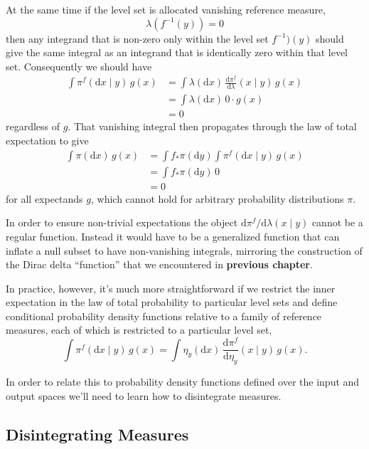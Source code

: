 \documentclass[11pt, oneside]{article}
\newcommand{\rnd}[2]{
  \ensuremath{ \frac{ \mathrm{d} #1}{ \mathrm{d} #2 } }
}
\begin{document}
At the same time if the level set is allocated vanishing reference measure,
%
\begin{equation*}
\lambda( f^{-1}(y) ) = 0
\end{equation*}
%
then any integrand that is non-zero only within the level set $f^{-1})(y)$ should 
give the same integral as an integrand that is identically zero within that level 
set.  Consequently we should have
%
\begin{align*}
\int \pi^{f}( \mathrm{d}x \mid y ) \, g(x)
&=
\int \lambda( \mathrm{d} x ) \, \rnd{ \pi^{f} }{ \lambda} (x \mid y) \, g(x)
\\
&=
\int \lambda( \mathrm{d} x ) \, 0 \cdot g(x)
\\
&=
0
\end{align*}
%
regardless of $g$.  That vanishing integral then propagates through the law of 
total expectation to give
%
\begin{align*}
\int \pi( \mathrm{d} x ) \, g(x)
&=
\int f_{*} \pi (\mathrm{d} y) \int \pi^{f}( \mathrm{d}x \mid y ) \, g(x)
\\
&=
\int f_{*} \pi (\mathrm{d} y) \, 0
\\
&=
0
\end{align*}
%
for all expectands $g$, which cannot hold for arbitrary probability distributions
$\pi$.

In order to ensure non-trivial expectations the object 
$\mathrm{d} \pi^{f} / \mathrm{d} \lambda(x \mid y)$ cannot be a regular function.
Instead it would have to be a generalized function that can inflate a null subset 
to have non-vanishing integrals, mirroring the construction of the Dirac delta
``function'' that we encountered in \textbf{previous chapter}.

In practice, however, it's much more straightforward if we restrict the inner 
expectation in the law of total probability to particular level sets and define 
conditional probability density functions relative to a family of reference measures, 
each of which is restricted to a particular level set,
%
\begin{equation*}
\int \pi^{f}( \mathrm{d}x \mid y ) \, g(x)
=
\int \eta_{y}( \mathrm{d} x ) \, \rnd{ \pi^{f} }{ \eta_{y} } (x \mid y) \, g(x).
\end{equation*}

In order to relate this to probability density functions defined over the input 
and output spaces we'll need to learn how to disintegrate measures.

\subsection{Disintegrating Measures}
\end{document}
